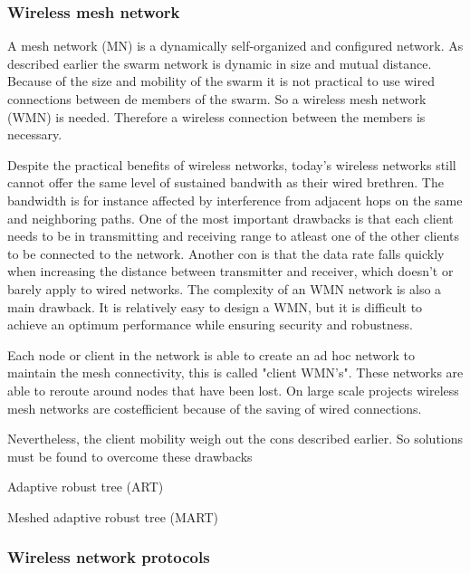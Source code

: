 \documentclass[10pt,a4paper]{article}
\begin{document}
\subsubsection{Wireless mesh network}
A mesh network (MN) is a dynamically self-organized and configured network. \cite{WMN1} As described earlier the swarm network is dynamic in size and mutual distance. Because of the size and mobility of the swarm it is not practical to use wired connections between de members of the swarm. So a wireless mesh network (WMN) is needed. Therefore a wireless connection between the members is necessary.

Despite the practical benefits of wireless networks, today's wireless networks still cannot offer the same level of sustained bandwith as their wired brethren. The bandwidth is for instance affected by interference from adjacent hops on the same and neighboring paths. \cite{architectureandalgorithmsmultichannelwirelessmeshnetwork} One of the most important drawbacks is that each client needs to be in transmitting and receiving range to atleast one of the other clients to be connected to the network. \cite{wirelessmeshnetworksopportunitiesandchallenges} Another con is that the data rate falls quickly when increasing the distance between transmitter and receiver, which doesn't or barely apply to wired networks. \cite{architectureandalgorithmsmultichannelwirelessmeshnetwork} The complexity of an WMN network is also a main drawback. It is relatively easy to design a WMN, but it is difficult to achieve an optimum performance while ensuring security and robustness.\cite{wirelessmeshnetworksopportunitiesandchallenges} 

Each node or client in the network is able to create an ad hoc network to maintain the mesh connectivity, this is called "client WMN's". These networks are able to reroute around nodes that have been lost. On large scale projects wireless mesh networks are costefficient because of the saving of wired connections.\cite{meshnetworking} 

Nevertheless, the client mobility weigh out the cons described earlier. So solutions must be found to overcome these drawbacks




Adaptive robust tree (ART)


Meshed adaptive robust tree (MART)


\subsubsection{Wireless network protocols}
\end{document}
